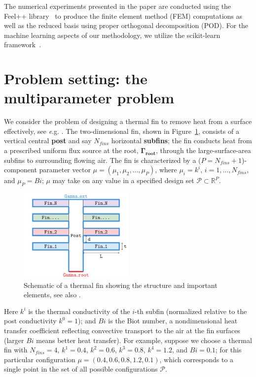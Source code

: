\documentclass[graybox]{svmult}
\begin{document}
The numerical experiments presented in the paper are conducted using the Feel++ library~\cite{feelpp} to produce the finite element method (FEM) computations as well as the reduced basis using proper orthogonal decomposition (POD). For the machine learning aspects of our methodology, we utilize the scikit-learn framework~\cite{sklearn}. 



\section{Problem setting: the multiparameter problem}
\label{sec:2}
We consider the problem of designing a thermal fin to remove heat from a surface effectively, see {\emph e.g.} \cite{rbpp}. The two-dimensional fin, shown in Figure~\ref{fig:thermal-fin}, consists of a vertical central \textbf{post} and say $N_{fins}$ horizontal \textbf{subfins}; the fin conducts heat from a prescribed uniform flux source at the root, $\mathbf{\Gamma_{\text{root}}}$, through the large-surface-area subfins to surrounding flowing air. The fin is characterized by a ($P=N_{fins}+1$)-component parameter vector $\mu = (\mu_1, \mu_2, \ldots, \mu_{P})$, where $\mu_i = k^i$, $i = 1, \ldots, N_{fins}$, and $\mu_{P} = Bi$; $\mu$ may take on any value in a specified design set $\mathcal{P} \subset \mathbb{R}^{P}$.

\begin{figure}[htbp]
\centering
\includegraphics[width=0.5\textwidth]{img-thermal-fin.png}
\caption{Schematic of a thermal fin showing the structure and important elements, see also \cite{rbpp}.}
\label{fig:thermal-fin}
\end{figure}
Here $k^i$ is the thermal conductivity of the $i$-th subfin (normalized relative to the post conductivity $k^0 = 1$); and $Bi$ is the Biot number, a nondimensional heat transfer coefficient reflecting convective transport to the air at the fin surfaces (larger $Bi$ means better heat transfer). For example, suppose we choose a thermal fin with $N_{fins}=4$, $k^1 = 0.4$, $k^2 = 0.6$, $k^3 = 0.8$, $k^4 = 1.2$, and $Bi = 0.1$; for this particular configuration $\mu = (0.4, 0.6, 0.8, 1.2, 0.1)$, which corresponds to a single point in the set of all possible configurations $\mathcal{P}$. 
\end{document}
